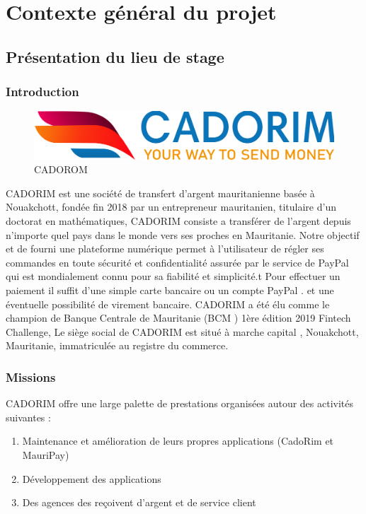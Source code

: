 \chapter{Contexte général du projet}
\label{chap:introduction}
\section{Présentation du lieu de stage}
\subsection{Introduction}
\begin{figure}[h]
	\includegraphics[scale=0.14]{./Template LaTeX/Images/cado_logo.png}
	\centering
	\caption{CADOROM}
\end{figure}
CADORIM est une société de transfert d’argent mauritanienne basée à Nouakchott,
fondée fin 2018 par un entrepreneur mauritanien, titulaire d'un doctorat en
mathématiques,
CADORIM consiste a transférer de l’argent depuis n’importe quel pays dans le
monde vers ses proches en Mauritanie. Notre objectif et de fourni une plateforme
numérique permet à l’utilisateur de régler ses commandes en toute sécurité et
confidentialité assurée par le service de PayPal qui est mondialement connu pour sa
fiabilité et simplicité.t Pour effectuer un paiement il suffit d'une simple carte bancaire
ou un compte PayPal . et une éventuelle possibilité de virement bancaire.
CADORIM a été élu comme le champion de Banque Centrale de Mauritanie (BCM )
1ère édition 2019 Fintech Challenge,
Le siège social de CADORIM est situé à marche capital , Nouakchott, Mauritanie,
immatriculée au registre du commerce.
\subsection{Missions}
CADORIM offre une large palette de prestations organisées autour des activités suivantes :
\begin{enumerate}
	
	\item Maintenance et amélioration de leurs propres applications (CadoRim et MauriPay)
	\item Développement des applications 
	\item Des agences des reçoivent d'argent et de service client
	
\end{enumerate}
